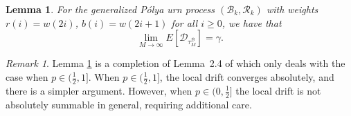 \documentclass[twoside,12pt, a4paper]{article}
\newtheorem{lemma}{Lemma}[section]
\numberwithin{equation}{section}
\theoremstyle{remark}
\newtheorem{remark}{Remark}[section]
\begin{document}
	\begin{lemma} \label{lm: convergence of mean of discrepancies}
		For the generalized P\'{o}lya urn process $(\mathcal{B}_{k},\mathcal{R}_{k})$ with weights $r(i)= w(2i)$, $b(i) = w(2i+1)$ for all $i\geq 0$, we have that
		$$
		\lim_{M\to\infty} E[\mathcal{D}_{\tau_M^{\mathcal{B}}}] = \gamma. 
		$$
	\end{lemma} 
	\begin{remark}
		Lemma \ref{lm: convergence of mean of discrepancies} is a completion of Lemma~2.4 of \cite{KMP23} which only deals with the case when ${p \in (\frac{1}{2}, 1]}$. When $p \in (\frac{1}{2}, 1]$, the local drift converges absolutely, and there is a simpler argument. However, when $p \in (0,\frac{1}{2}]$ the local drift is not absolutely summable in general, requiring additional care.
	\end{remark}
\end{document}
